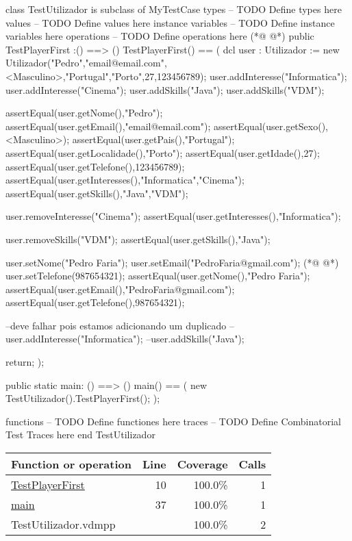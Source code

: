 \begin{vdmpp}[breaklines=true]
class TestUtilizador is subclass of MyTestCase
types
-- TODO Define types here
values
-- TODO Define values here
instance variables
-- TODO Define instance variables here
operations
-- TODO Define operations here
(*@
\label{TestPlayerFirst:10}
@*)
public TestPlayerFirst :() ==> ()
TestPlayerFirst() ==
(
 dcl user : Utilizador := new Utilizador("Pedro","email@email.com",<Masculino>,"Portugal","Porto",27,123456789);
 user.addInteresse("Informatica");
 user.addInteresse("Cinema");
 user.addSkills("Java");
 user.addSkills("VDM");
 
 assertEqual(user.getNome(),"Pedro");
 assertEqual(user.getEmail(),"email@email.com");
 assertEqual(user.getSexo(),<Masculino>);
 assertEqual(user.getPais(),"Portugal");
 assertEqual(user.getLocalidade(),"Porto");
 assertEqual(user.getIdade(),27);
 assertEqual(user.getTelefone(),123456789);
 assertEqual(user.getInteresses(),{"Informatica","Cinema"});
 assertEqual(user.getSkills(),{"Java","VDM"});
 
 user.removeInteresse("Cinema");
 assertEqual(user.getInteresses(),{"Informatica"});
 
 user.removeSkills("VDM");
 assertEqual(user.getSkills(),{"Java"});
 
 user.setNome("Pedro Faria");
 user.setEmail("PedroFaria@gmail.com");
(*@
\label{main:37}
@*)
 user.setTelefone(987654321);
 assertEqual(user.getNome(),"Pedro Faria");
 assertEqual(user.getEmail(),"PedroFaria@gmail.com");
 assertEqual(user.getTelefone(),987654321);
 
 --deve falhar pois estamos adicionando um duplicado
 --user.addInteresse("Informatica");
 --user.addSkills("Java");
 
 return;
);

public static main: () ==> ()
main() ==
(
   new TestUtilizador().TestPlayerFirst();
);

functions
-- TODO Define functiones here
traces
-- TODO Define Combinatorial Test Traces here
end TestUtilizador
\end{vdmpp}
\bigskip
\begin{longtable}{|l|r|r|r|}
\hline
Function or operation & Line & Coverage & Calls \\
\hline
\hline
\hyperref[TestPlayerFirst:10]{TestPlayerFirst} & 10&100.0\% & 1 \\
\hline
\hyperref[main:37]{main} & 37&100.0\% & 1 \\
\hline
\hline
TestUtilizador.vdmpp & & 100.0\% & 2 \\
\hline
\end{longtable}

